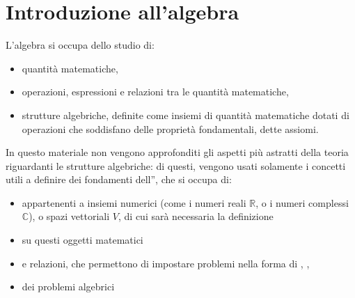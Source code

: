 \documentclass[letterpaper,10pt,italian]{jupyterBook}
\begin{document}
\chapter{Introduzione all’algebra}
\label{\detokenize{ch/algebra:introduzione-all-algebra}}\label{\detokenize{ch/algebra:math-hs-algebra}}\label{\detokenize{ch/algebra::doc}}
\sphinxAtStartPar
L’algebra si occupa dello studio di:
\begin{itemize}
\item {} 
\sphinxAtStartPar
quantità matematiche,

\item {} 
\sphinxAtStartPar
operazioni, espressioni e relazioni tra le quantità matematiche,

\item {} 
\sphinxAtStartPar
strutture algebriche, definite come insiemi di quantità matematiche dotati di operazioni che soddisfano delle proprietà fondamentali, dette assiomi.

\end{itemize}

\sphinxAtStartPar
In questo materiale non vengono approfonditi gli aspetti più astratti della teoria riguardanti le strutture algebriche: di questi, vengono usati solamente i concetti utili a definire dei fondamenti dell”, che si occupa di:
\begin{itemize}
\item {} 
\sphinxAtStartPar
{} appartenenti a insiemi numerici (come i numeri reali \(\mathbb{R}\), o i numeri complessi \(\mathbb{C}\)), o spazi vettoriali \(V\), di cui sarà necessaria la definizione

\item {} 
\sphinxAtStartPar
{} su questi oggetti matematici

\item {} 
\sphinxAtStartPar
{} e relazioni, che permettono di impostare problemi nella forma di , , 

\item {} 
\sphinxAtStartPar
{} dei problemi algebrici

\end{itemize}

\sphinxstepscope
\end{document}
